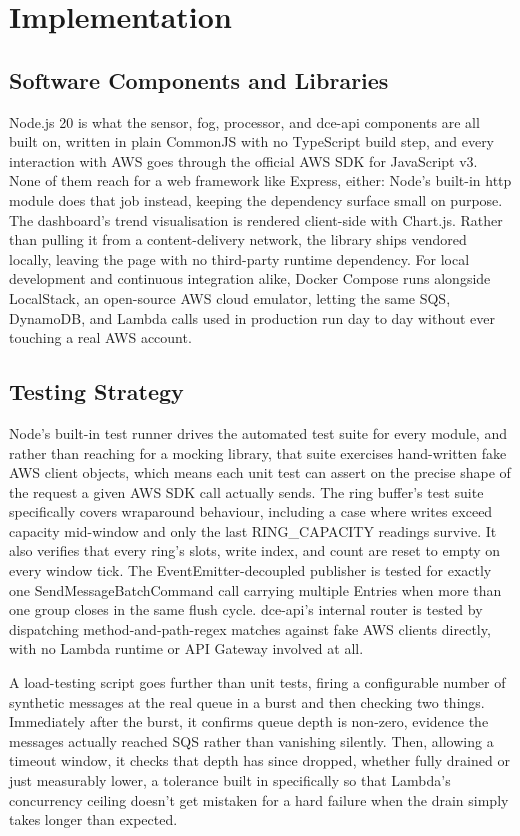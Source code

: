 \documentclass[conference]{IEEEtran}
\begin{document}
\section{Implementation}

\subsection{Software Components and Libraries}
Node.js 20 is what the sensor, fog, processor, and dce-api components are all built on, written in plain CommonJS with no TypeScript build step, and every interaction with AWS goes through the official AWS SDK for JavaScript v3. None of them reach for a web framework like Express, either: Node's built-in http module does that job instead, keeping the dependency surface small on purpose. The dashboard's trend visualisation is rendered client-side with Chart.js. Rather than pulling it from a content-delivery network, the library ships vendored locally, leaving the page with no third-party runtime dependency. For local development and continuous integration alike, Docker Compose runs alongside LocalStack, an open-source AWS cloud emulator, letting the same SQS, DynamoDB, and Lambda calls used in production run day to day without ever touching a real AWS account.

\subsection{Testing Strategy}
Node's built-in test runner drives the automated test suite for every module, and rather than reaching for a mocking library, that suite exercises hand-written fake AWS client objects, which means each unit test can assert on the precise shape of the request a given AWS SDK call actually sends. The ring buffer's test suite specifically covers wraparound behaviour, including a case where writes exceed capacity mid-window and only the last RING\_CAPACITY readings survive. It also verifies that every ring's slots, write index, and count are reset to empty on every window tick. The EventEmitter-decoupled publisher is tested for exactly one SendMessageBatchCommand call carrying multiple Entries when more than one group closes in the same flush cycle. dce-api's internal router is tested by dispatching method-and-path-regex matches against fake AWS clients directly, with no Lambda runtime or API Gateway involved at all.

A load-testing script goes further than unit tests, firing a configurable number of synthetic messages at the real queue in a burst and then checking two things. Immediately after the burst, it confirms queue depth is non-zero, evidence the messages actually reached SQS rather than vanishing silently. Then, allowing a timeout window, it checks that depth has since dropped, whether fully drained or just measurably lower, a tolerance built in specifically so that Lambda's concurrency ceiling doesn't get mistaken for a hard failure when the drain simply takes longer than expected.
\end{document}
